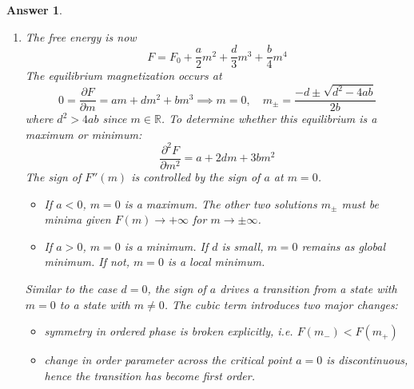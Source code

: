 \documentclass[a4paper]{article}
\newtheorem{ans}{Answer}[section]
\theoremstyle{new}
\begin{document}
\begin{ans}
\begin{enumerate}[label=(\alph*)]
\item The free energy is now
$$F=F_0+\frac{a}{2}m^2+\frac{d}{3}m^3+\frac{b}{4}m^4$$
The equilibrium magnetization occurs at
$$0=\frac{\partial F}{\partial m}=am+dm^2+bm^3\implies m=0,\quad m_\pm=\frac{-d\pm\sqrt{d^2-4ab}}{2b}$$
where $d^2>4ab$ since $m\in\mathbb{R}$. To determine whether this equilibrium is a maximum or minimum:
$$\frac{\partial^2F}{\partial m^2}=a+2dm+3bm^2$$
The sign of $F''(m)$ is controlled by the sign of $a$ at $m=0$.
\begin{itemize}
    \item If $a<0$, $m=0$ is a maximum. The other two solutions $m_\pm$ must be minima given $F(m)\rightarrow+\infty$ for $m\rightarrow\pm\infty$.
    \item If $a>0$, $m=0$ is a minimum. If $d$ is small, $m=0$ remains as global minimum. If not, $m=0$ is a local minimum.
\end{itemize}
Similar to the case $d=0$, the sign of $a$ drives a transition from a state with $m=0$ to a state with $m\neq 0$. The cubic term introduces two major changes:
\begin{itemize}
    \item symmetry in ordered phase is broken explicitly, i.e. $F(m_-)<F(m_+)$
    \item change in order parameter across the critical point $a=0$ is discontinuous, hence the transition has become first order.
\end{itemize}
\end{enumerate}
\end{ans}
\newpage
\end{document}
